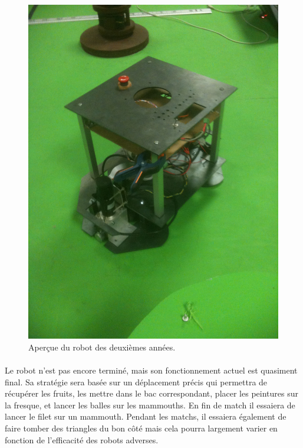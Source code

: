 \begin{figure}[!h]
\centering
\includegraphics[scale=0.1]{robot}
\caption{Aperçue du robot des deuxièmes années.}
\label{robot}
\end{figure}

\paragraph{}
Le robot n'est pas encore terminé, mais son fonctionnement actuel est quasiment final. Sa stratégie sera basée sur un déplacement précis qui permettra de récupérer les fruits, les mettre dans le bac correspondant, placer les peintures sur la fresque, et lancer les balles sur les mammouths. En fin de match il essaiera de lancer le filet sur un mammouth. Pendant les matchs, il essaiera également de faire tomber des triangles du bon côté mais cela pourra largement varier en fonction de l'efficacité des robots adverses.

